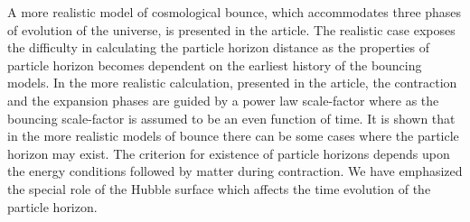 \documentclass[24pt]{article}
\begin{document}
A more realistic model of cosmological bounce, which accommodates
three phases of evolution of the universe, is presented in the
article. The realistic case exposes the difficulty in calculating the
particle horizon distance as the properties of particle horizon
becomes dependent on the earliest history of the bouncing models.  In
the more realistic calculation, presented in the article, the
contraction and the expansion phases are guided by a power law
scale-factor where as the bouncing scale-factor is assumed to be an
even function of time. It is shown that in the more realistic models of bounce 
there can be some cases where the particle horizon may
exist. The criterion for existence of particle horizons depends upon
the energy conditions followed by matter during contraction. We have
emphasized the special role of the Hubble surface which affects
the time evolution of the particle horizon.
\end{document}

